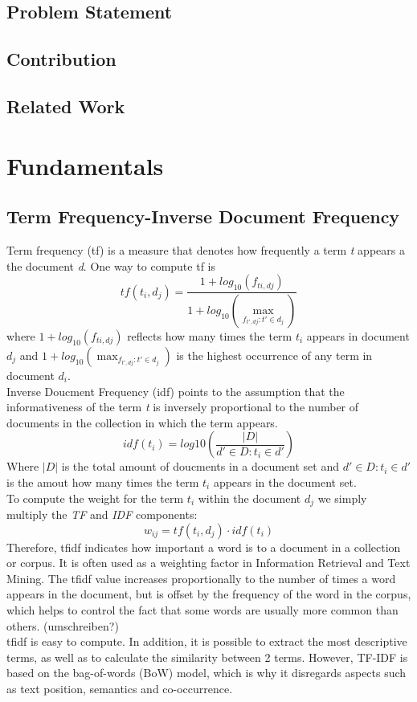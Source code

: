 \documentclass[a4paper, 11pt,titlepage,oneside,openany]{book}
\begin{document}
\section{Problem Statement}
 
 

\section{Contribution}

 

\section{Related Work}

\chapter{Fundamentals}

\section{Term Frequency-Inverse Document Frequency}
Term frequency (\gls{tf}) is a measure that denotes how frequently a term \textit{t} appears a the document \textit{d}. One way to compute \gls{tf} is \\
\[
tf(t_i, d_j)=\frac{1+log_{10}(f_{ti,dj})}{1+log_{10}(\max_{f_{t', dj}:t'\in d_j})}
\]
where $1+log_{10}(f_{ti,dj})$ reflects how many times the term $t_i$ appears in document $d_j$ and $1+log_{10}(\max_{f_{t', dj}:t'\in d_j})$ is the highest occurrence of any term in document $d_i$.\\

\noindent Inverse Doucment Frequency (\gls{idf}) points to the assumption that the informativeness of the term \textit{t} is inversely proportional to the number of documents in the collection in which the term appears.\\
\[
idf(t_i)=log{10}(\frac{|D|}{d' \in D : t_i \in d'})
\]
Where $|D|$ is the total amount of doucments in a document set and $d' \in D : t_i \in d'$ is the amout how many times the term $t_i$ appears in the document set.\\

\noindent To compute the weight for the term $t_i$ within the document $d_j$ we simply multiply the \textit{TF} and \textit{IDF} components:
\[
w_{ij}=tf(t_i, d_j)\cdot idf(t_i)
\]
Therefore, \Gls{tfidf} indicates how important a word is to a document in a collection or corpus. It is often used as a weighting factor in Information Retrieval and Text Mining. The \Gls{tfidf} value increases proportionally to the number of times a word appears in the document, but is offset by the frequency of the word in the corpus, which helps to control the fact that some words are usually more common than others. (umschreiben?) \\
\noindent \Gls{tfidf} is easy to compute. In addition, it is possible to extract the most descriptive terms, as well as to calculate the similarity between 2 terms. However, TF-IDF is based on the bag-of-words (BoW) model, which is why it disregards aspects such as text position, semantics and co-occurrence.
\end{document}
